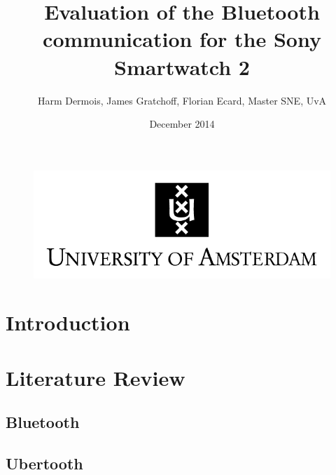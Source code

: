 \documentclass{article}
\begin{document}
 



\begin{figure}[!h]
 	\begin{center}
		\huge \title{Evaluation of the Bluetooth communication for the Sony Smartwatch 2}
		\author{Harm Dermois, James Gratchoff, Florian Ecard,  Master SNE, UvA} 
		\date{December 2014\\}
	\maketitle 
		\includegraphics{uva.jpeg}
		\label{sec:uva}
	\end{center}
\end{figure}

\newpage

\newcommand{\pend}{
 \\ 
\indent}

\begin{abstract}
 
\end{abstract}

\newpage

\tableofcontents

\newpage



\section{Introduction}
\newpage
\section{Literature Review}

	\subsection{Bluetooth}
	\subsection{Ubertooth}
\end{document}
